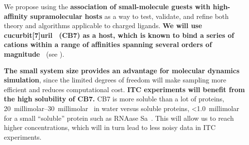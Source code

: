 \documentclass[10pt,final]{article}
\begin{document}
We propose using the \textbf{association of small-molecule guests with high-affinity supramolecular hosts} as a way to test, validate, and refine both theory and algorithms applicable to charged ligands. \textbf{We will use cucurbit[7]uril~\cite{Lagona2005a} (CB7) as a host, which is known to bind a series of cations within a range of affinities spanning several orders of magnitude~\cite{Cao2013a}} (see ). 

\textbf{The small system size provides an advantage for molecular dynamics simulation}, since the limited degrees of freedom will make sampling more efficient and reduces computational cost. \textbf{ITC experiments will benefit from the high solubility of CB7.} CB7 is more soluble than a lot of proteins, \SIrange{20}{30}{millimolar}~\cite{Lagona2005a} %
in water versus soluble proteins,  \textless \SI{1.0}{millimolar} for a small ``soluble'' protein such as RNAase Sa~\cite{Pace2004a}. This will allow us to reach higher concentrations, which will in turn lead to less noisy data in ITC experiments.
\end{document}
